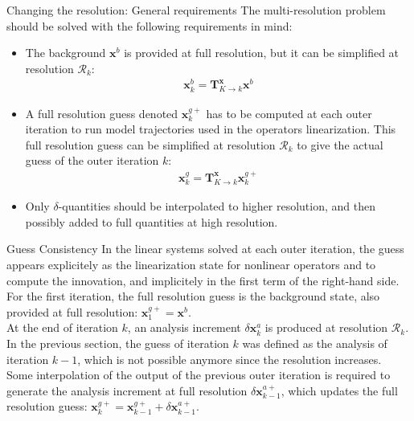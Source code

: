 \documentclass[8pt]{beamer}
\begin{document}
\begin{frame}{Changing the resolution: General requirements}
 The multi-resolution problem should be solved with the following requirements in mind:
\begin{itemize}
\item The background $\mathbf{x}^b$ is provided at full resolution, but it can be simplified at resolution $\mathcal{R}_k$:
\begin{align}
\boxed{\mathbf{x}^b_k = \mathbf{T}^\mathbf{x}_{K \rightarrow k} \mathbf{x}^b}
\end{align}
\item A full resolution guess denoted $\mathbf{x}^{g+}_k$ has to be computed at each outer iteration to run model trajectories used in the operators linearization. This full resolution guess can be simplified at resolution $\mathcal{R}_k$ to give the actual guess of the outer iteration $k$:
\begin{align}
\boxed{\mathbf{x}^g_k = \mathbf{T}^\mathbf{x}_{K \rightarrow k} \mathbf{x}^{g+}_k}
\end{align}
\item Only $\delta$-quantities should be interpolated to higher resolution, and then possibly added to full quantities at high resolution.
\end{itemize}
\end{frame}



\begin{frame}{Guess Consistency}
 In the linear systems solved at each outer iteration, the guess appears explicitely as the linearization state for nonlinear operators and to compute the innovation, and implicitely in the first term of the right-hand side.\\
\vspace{+0.2cm}
For the first iteration, the full resolution guess is the background state, also provided at full resolution: $\mathbf{x}^{g+}_1 = \mathbf{x}^b$.\\
\vspace{+0.2cm}
At the end of iteration $k$, an analysis increment $\delta \mathbf{x}^a_k$ is produced at resolution $\mathcal{R}_k$. In the previous section, the guess of iteration $k$ was defined as the analysis of iteration $k-1$, which is not possible anymore since the resolution increases.\\
\vspace{+0.2cm}
Some interpolation of the output of the previous outer iteration is required to generate the analysis increment at full resolution $\delta \mathbf{x}^{a+}_{k-1}$, which updates the full resolution guess: $\mathbf{x}^{g+}_k = \mathbf{x}^{g+}_{k-1} + \delta \mathbf{x}^{a+}_{k-1}$. 
\end{frame}
\end{document}
